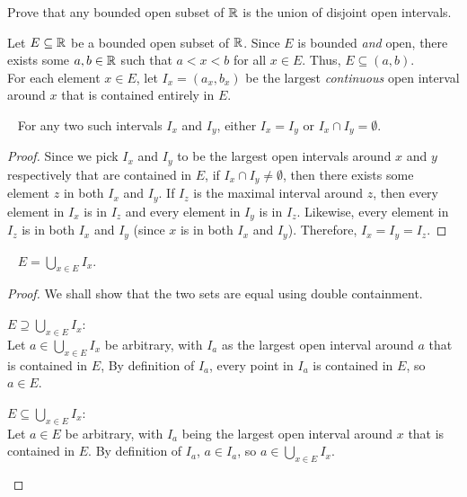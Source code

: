 \begin{problem}
  Prove that any bounded open subset of $\mathbb{R}$
  is the union of disjoint open intervals.
\end{problem}

\begin{answer}
  Let $E \subseteq \mathbb{R}$ be a bounded open subset of $\mathbb{R}$.
  Since $E$ is bounded \emph{and} open, there exists some $a, b \in \mathbb{R}$ such that
  $a < x < b$ for all $x \in E$.
  Thus, $E \subseteq (a, b)$.\\
  For each element $x \in E$, let $I_x = (a_x, b_x)$ be the largest
  \emph{continuous} open interval around $x$ that is contained entirely in $E$.

  \begin{claim}~\label{claim:2.2}
    For any two such intervals $I_x$ and $I_y$,
    either $I_x = I_y$ or $I_x \cap I_y = \emptyset$.

    \begin{proof}
      Since we pick $I_x$ and $I_y$ to be the largest open intervals
      around $x$ and $y$ respectively that are contained in $E$,
      if $I_x \cap I_y \neq \emptyset$, then there exists some element
      $z$ in both $I_x$ and $I_y$. If $I_z$ is the maximal interval
      around $z$, then every element in
      $I_x$ is in $I_z$ and every element in $I_y$ is in $I_z$.
      Likewise, every element in $I_z$ is in both $I_x$ and $I_y$
      (since $x$ is in both $I_x$ and $I_y$).
      Therefore, $I_x = I_y = I_z$.
    \end{proof}
  \end{claim}

  \begin{claim}~\label{claim:2.3}
    $E = \bigcup\limits_{x \in E} I_x$.

    \begin{proof}
      We shall show that the two sets are equal using double containment.
      \begin{enumarabic}
        \item $E \supseteq \bigcup_{x \in E} I_x$:\\
          Let $a \in \bigcup_{x \in E} I_x$ be arbitrary,
          with $I_a$ as the largest open interval around $a$ that is contained in $E$,
          By definition of $I_a$, every point in $I_a$ is contained in $E$,
          so $a \in E$.
        \item $E \subseteq \bigcup\limits_{x \in E} I_x$:\\
          Let $a \in E$ be arbitrary, with $I_a$ being the
          largest open interval around $x$ that is contained in $E$.
          By definition of $I_a$, $a \in I_a$, so $a \in \bigcup\limits_{x \in E} I_x$.
      \end{enumarabic}
    \end{proof}
    

\end{claim}
\end{answer}
